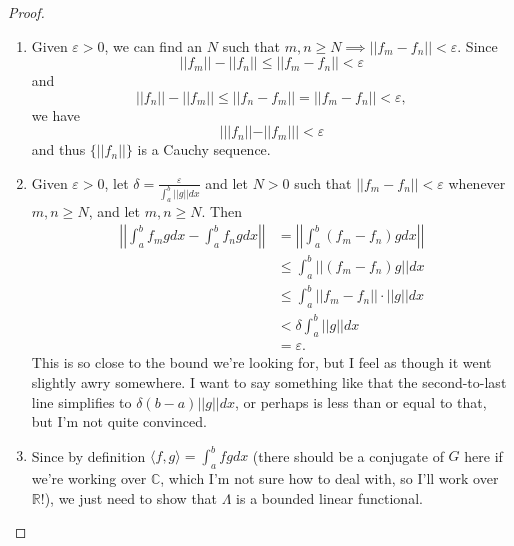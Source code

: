 \documentclass[12pt]{article}
\theoremstyle{definition}
\begin{document}
\begin{proof}\
	\begin{enumerate}[label=(\alph*)]
		\item Given $\varepsilon > 0$, we can find an $N$ such that $m, n \geq N \implies ||f_m - f_n|| < \varepsilon$.
		      Since \begin{equation*}
			      ||f_m|| - ||f_n|| \leq ||f_m - f_n|| < \varepsilon
		      \end{equation*}
		      and \begin{equation*}
			      ||f_n|| - ||f_m|| \leq ||f_n - f_m|| = ||f_m - f_n|| < \varepsilon,
		      \end{equation*}
		      we have \begin{equation*}
			      |||f_n|| - ||f_m||| < \varepsilon
		      \end{equation*}
		      and thus $\lbrace||f_n||\rbrace$ is a Cauchy sequence.
		\item Given $\varepsilon > 0$, let $\delta = \frac{\varepsilon}{\int_a^b ||g|| dx}$ and let $N > 0$ such that $||f_m-f_n||<\varepsilon$ whenever $m, n \geq N$, and let $m, n \geq N$.
		      Then \begin{align*}
			      \left|\left| \int_a^b f_m g dx - \int_a^b f_n g dx \right|\right| & = \left|\left| \int_a^b (f_m-f_n) g dx \right|\right| \\
                                                                              & \leq \int_a^b ||(f_m-f_n)g|| dx \\
                                                                              & \leq \int_a^b ||f_m-f_n|| \cdot ||g|| dx \\
                                                                              & < \delta \int_a^b ||g||dx \\
                                                                              & = \varepsilon.
		      \end{align*}
          This is so close to the bound we're looking for, but I feel as though it went slightly awry somewhere. I want to say something like that the second-to-last line simplifies to $\delta (b-a)||g||dx$, or perhaps is less than or equal to that, but I'm not quite convinced.
        \item Since by definition $\langle f, g \rangle = \int_a^b fg dx$ (there should be a conjugate of $G$ here if we're working over $\mathbb{C}$, which I'm not sure how to deal with, so I'll work over $\mathbb{R}$!), we just need to show that $\Lambda$ is a bounded linear functional.

\end{enumerate}
\end{proof}
\end{document}
